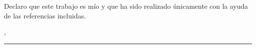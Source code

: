 %
\label{sec:declaration}
\thispagestyle{empty}

Declaro que este trabajo es mío y que ha sido realizado únicamente con la ayuda de las referencias incluidas.


\bigskip

\noindent\textit{\thesisUniversityCity, \thesisDate}

\smallskip

\begin{flushright}
	\begin{minipage}{5cm}
		\rule{\textwidth}{1pt}
		\centering\thesisName
	\end{minipage}
\end{flushright}

